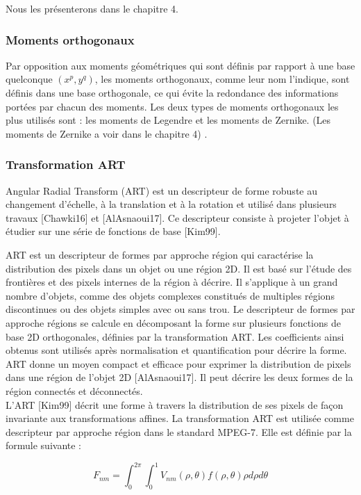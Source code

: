 Nous les présenterons dans le chapitre 4.


\subsubsection{Moments orthogonaux}
Par opposition aux moments géométriques qui sont définis par rapport à une base quelconque $(x^p, y^q)$, les moments orthogonaux, comme leur nom l’indique, sont définis dans une base orthogonale, ce qui évite la redondance des informations portées par chacun des moments. Les deux types de moments orthogonaux les plus utilisés sont : les moments de Legendre et les moments de Zernike. (Les moments de Zernike a voir dans le chapitre 4) .

\subsubsection{Transformation ART}
Angular Radial Transform (ART) est un descripteur de forme robuste au changement d’échelle, à la translation et à la rotation et utilisé dans plusieurs travaux [Chawki16] et [AlAsnaoui17]. Ce descripteur consiste à projeter l’objet à étudier sur une série de fonctions de base [Kim99].

ART est un descripteur de formes par approche région qui caractérise la distribution des pixels dans un objet ou une région 2D. Il est basé sur l’étude des frontières et des pixels internes de la région à décrire. Il s’applique à un grand nombre d’objets, comme des objets complexes constitués de multiples régions discontinues ou des objets simples avec ou sans trou. Le descripteur de formes par approche régions se calcule en décomposant la forme sur plusieurs fonctions de base 2D orthogonales, définies par la transformation ART. Les coefficients ainsi obtenus sont utilisés après normalisation et quantification pour décrire la forme. ART donne un moyen compact et efficace pour exprimer la distribution de pixels dans une région de l’objet 2D [AlAsnaoui17]. Il peut décrire les deux formes de la région connectés et déconnectés.\\

L’ART [Kim99] décrit une forme à travers la distribution de ses pixels de façon invariante aux transformations affines. La transformation ART est utilisée comme descripteur par approche
région dans le standard MPEG-7. Elle est définie par la formule suivante :

\begin{equation}
    F_{nm} = {\int }_0^{2\pi} {\int }_0^{1} V_{nm}(\rho, \theta) f(\rho, \theta) \rho d\rho  d\theta
\end{equation}

